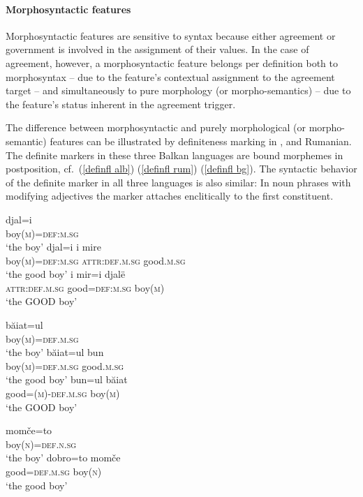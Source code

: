 \paragraph{Morphosyntactic features} 
Morphosyntactic features are sensitive to syntax because either agreement or government is involved in the assignment of their values. In the case of agreement, however, a morphosyntactic feature belongs per definition both to morphosyntax – due to the feature's contextual assignment to the agreement target – and simultaneously to pure morphology (or morpho-semantics) – due to the feature's status inherent in the agreement trigger.

The difference between morphosyntactic and purely morphological (or morpho-semantic) features can be illustrated by definiteness marking in ,  and Rumanian. The definite markers in these three Balkan languages are bound morphemes in postposition, cf.~(\ref{definfl alb}) (\ref{definfl rum}) (\ref{definfl bg}). The syntactic behavior of the definite marker in all three languages is also similar: In noun phrases with modifying adjectives the marker attaches enclitically to the first constituent. 
\begin{exe}
\ex 
{} 
\begin{xlist}
\ex \label{definfl alb}
\gll	djal=i\\
	boy(\textsc{m})=\textsc{def:m.sg}\\
\glt	‘the boy’
\ex \label{encl alb a}
\gll	djal=i 				i 			mire\\
	boy(\textsc{m})=\textsc{def:m.sg} 	\textsc{attr:def.m.sg}	good.\textsc{m.sg}\\
\glt	‘the good boy’
\ex \label{encl alb b}
\gll	i 			mir=i 			djalë\\
	\textsc{attr:def.m.sg} 	good=\textsc{def:m.sg} 	boy(\textsc{m})\\
\glt	‘the GOOD boy’ 
\end{xlist}
\ex 
{}
\begin{xlist}
\ex \label{definfl rum}
\gll	băiat=ul\\
	boy(\textsc{m})=\textsc{def.m.sg}\\
\glt	‘the boy’
\ex \label{encl rum a}
\gll	băiat=ul 				bun\\
	boy(\textsc{m})=\textsc{def.m.sg} 	good.\textsc{m.sg}\\
\glt	‘the good boy’
\ex \label{encl rum b}
\gll	bun=ul 					băiat\\
	good=(\textsc{m})-\textsc{def.m.sg} 	boy(\textsc{m})\\
\glt	‘the GOOD boy’
\end{xlist}
\ex
{}
\begin{xlist}
\ex \label{definfl bg}
\gll	momče=to\\
	boy(\textsc{n})=\textsc{def.n.sg}\\
\glt	‘the boy’
\ex \label{encl bg}
\gll	dobro=to 		momče\\
	good=\textsc{def.m.sg}	boy(\textsc{n})\\
\glt	‘the good boy’
\end{xlist}	
\end{exe}
